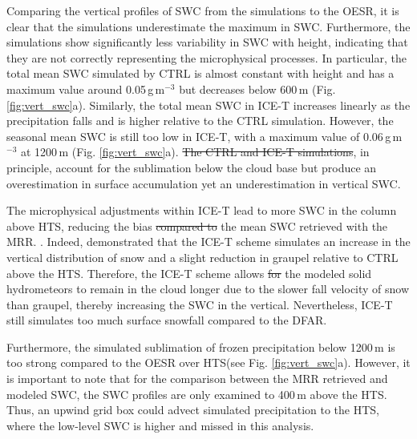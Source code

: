\documentclass{ametsocV5}
\providecommand{\DIFadd}[1]{{\protect\color{blue}\uwave{#1}}} %
\providecommand{\DIFdel}[1]{{\protect\color{red}\sout{#1}}}                      %
\providecommand{\DIFaddbegin}{} %
\providecommand{\DIFaddend}{} %
\providecommand{\DIFdelbegin}{} %
\providecommand{\DIFdelend}{} %
\newcommand{\DIFscaledelfig}{0.5}
\newlength{\DIFdelgraphicswidth} %
\newlength{\DIFdelgraphicsheight} %
\newcommand{\DIFaddincludegraphics}[2][]{{\color{blue}\fbox{\DIFOincludegraphics[#1]{#2}}}} %
\newcommand{\DIFdelincludegraphics}[2][]{%
\sbox{\DIFdelgraphicsbox}{\DIFOincludegraphics[#1]{#2}}%
\settoboxwidth{\DIFdelgraphicswidth}{\DIFdelgraphicsbox} %
\settoboxtotalheight{\DIFdelgraphicsheight}{\DIFdelgraphicsbox} %
\scalebox{\DIFscaledelfig}{%
\parbox[b]{\DIFdelgraphicswidth}{\usebox{\DIFdelgraphicsbox}\\[-\baselineskip] \rule{\DIFdelgraphicswidth}{0em}}\llap{\resizebox{\DIFdelgraphicswidth}{\DIFdelgraphicsheight}{%
\setlength{\unitlength}{\DIFdelgraphicswidth}%
\begin{picture}(1,1)%
\thicklines\linethickness{2pt} %
{\color[rgb]{1,0,0}\put(0,0){\framebox(1,1){}}}%
{\color[rgb]{1,0,0}\put(0,0){\line( 1,1){1}}}%
{\color[rgb]{1,0,0}\put(0,1){\line(1,-1){1}}}%
\end{picture}%
}\hspace*{3pt}}} %
} %
\DeclareRobustCommand{\DIFaddbegin}{\DIFOaddbegin \let\includegraphics\DIFaddincludegraphics} %
\DeclareRobustCommand{\DIFaddend}{\DIFOaddend \let\includegraphics\DIFOincludegraphics} %
\DeclareRobustCommand{\DIFdelbegin}{\DIFOdelbegin \let\includegraphics\DIFdelincludegraphics} %
\DeclareRobustCommand{\DIFdelend}{\DIFOaddend \let\includegraphics\DIFOincludegraphics} %
\begin{document}
		Comparing the vertical profiles of SWC from the simulations to the OESR, it is clear that the simulations underestimate the maximum in SWC. Furthermore, the simulations show significantly less variability in SWC with height, indicating that they are not correctly representing the microphysical processes. In particular, the total mean SWC simulated by CTRL is almost constant with height and has a maximum value around 0.05\,g\,m$^{-3}$ but decreases below 600\,m (Fig. \ref{fig:vert_swc}a). Similarly, the total mean SWC in ICE-T increases linearly as the precipitation falls and is higher relative to the CTRL simulation. However, the seasonal mean SWC is still too low in ICE-T, with a maximum value of 0.06\,g\,m$^{-3}$ at 1200\,m (Fig. \ref{fig:vert_swc}a). \DIFdelbegin \DIFdel{The CTRL and ICE-T simulations}\DIFdelend \DIFaddbegin \DIFadd{Thus}\DIFaddend , in principle, \DIFaddbegin \DIFadd{the CTRL and ICE-T simulations }\DIFaddend account for the sublimation below the cloud base but produce an overestimation in surface accumulation yet an underestimation in vertical SWC. 

		The microphysical adjustments within ICE-T lead to more SWC in the column above HTS, reducing the bias \DIFdelbegin \DIFdel{compared to }\DIFdelend \DIFaddbegin \DIFadd{than }\DIFaddend the mean SWC retrieved with the MRR. \citep{engdahl_effects_2020}. Indeed, \citet{engdahl_effects_2020} demonstrated that the ICE-T scheme simulates an increase in the vertical distribution of snow and a slight reduction in graupel relative to CTRL above the HTS. Therefore, the ICE-T scheme allows \DIFdelbegin \DIFdel{for }\DIFdelend the modeled solid hydrometeors to remain in the cloud longer due to the slower fall velocity of snow than graupel, thereby increasing the SWC in the vertical. Nevertheless, ICE-T still simulates too much surface snowfall compared to the DFAR. 

		Furthermore, the simulated sublimation of frozen precipitation below 1200\,m is too strong compared to the OESR over HTS(see Fig. \ref{fig:vert_swc}a). However, it is important to note that for the comparison between the MRR retrieved and modeled SWC, the SWC profiles are only examined to 400\,m above the HTS. Thus, an upwind grid box could advect simulated precipitation to the HTS, where the low-level SWC is higher and missed in this analysis.
\end{document}
